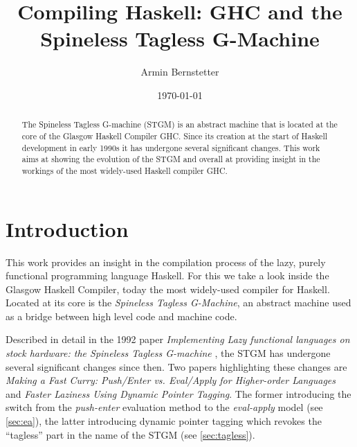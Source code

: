 \documentclass[runningheads]{llncs}
\begin{document}
%
\title{Compiling Haskell: GHC and the Spineless Tagless G-Machine}
%
%
\author{Armin Bernstetter}
\date{\today}
%
%
%
\maketitle              %
%
\begin{abstract}
The Spineless Tagless G-machine (STGM) is an abstract machine that is located at the core of the Glasgow Haskell Compiler GHC. Since its creation at the start of Haskell development in early 1990s it has undergone several significant changes. This work aims at showing the evolution of the STGM and overall at providing insight in the workings of the most widely-used Haskell compiler GHC.

\end{abstract}
%
%
%

\section{Introduction}

This work provides an insight in the compilation process of the lazy, purely functional programming language Haskell. For this we take a look inside the Glasgow Haskell Compiler, today the most widely-used compiler for Haskell. Located at its core is the \textit{Spineless Tagless G-Machine}, an abstract machine used as a bridge between high level code and machine code.

Described in detail in the 1992 paper \textit{Implementing Lazy functional languages on stock hardware: the Spineless Tagless G-machine} \cite{jones1992implementing}, the STGM has undergone several significant changes since then. Two papers highlighting these changes are \textit{Making a Fast Curry: Push/Enter vs.
Eval/Apply for Higher-order Languages}\cite{marlow2004making} and \textit{Faster Laziness Using Dynamic Pointer Tagging}\cite{marlow2007faster}. The former introducing the switch from the \textit{push-enter} evaluation method to the \textit{eval-apply} model (see \cref{sec:ea}), the latter introducing dynamic pointer tagging which revokes the \enquote{tagless} part in the name of the STGM (see \cref{sec:tagless}).
\end{document}
